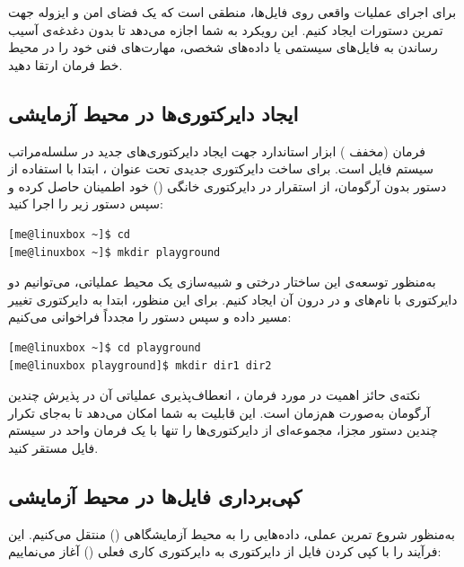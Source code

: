 برای اجرای عملیات واقعی روی فایل‌ها، منطقی است که یک فضای امن و ایزوله جهت تمرین دستورات ایجاد کنیم. این رویکرد به شما اجازه می‌دهد تا بدون دغدغه‌ی آسیب رساندن به فایل‌های سیستمی یا داده‌های شخصی، مهارت‌های فنی خود را در محیط خط فرمان ارتقا دهید.

\subsection{ایجاد دایرکتوری‌ها در محیط آزمایشی}

فرمان  (مخفف ) ابزار استاندارد جهت ایجاد دایرکتوری‌های جدید در سلسله‌مراتب سیستم‌ فایل است. برای ساخت دایرکتوری جدیدی تحت عنوان ، ابتدا با استفاده از دستور  بدون آرگومان، از استقرار در دایرکتوری خانگی () خود اطمینان حاصل کرده و سپس دستور زیر را اجرا کنید:

\begin{latin}
\begin{lstlisting}
[me@linuxbox ~]$ cd
[me@linuxbox ~]$ mkdir playground
\end{lstlisting}
\end{latin}

به‌منظور توسعه‌ی این ساختار درختی و شبیه‌سازی یک محیط عملیاتی، می‌توانیم دو دایرکتوری با نام‌های  و  در درون آن ایجاد کنیم. برای این منظور، ابتدا به دایرکتوری  تغییر مسیر داده و سپس دستور  را مجدداً فراخوانی می‌کنیم:

\begin{latin}
\begin{lstlisting}
[me@linuxbox ~]$ cd playground
[me@linuxbox playground]$ mkdir dir1 dir2
\end{lstlisting}
\end{latin}

نکته‌ی حائز اهمیت در مورد فرمان ، انعطاف‌پذیری عملیاتی آن در پذیرش چندین آرگومان به‌صورت هم‌زمان است. این قابلیت به شما امکان می‌دهد تا به‌جای تکرار چندین دستور مجزا، مجموعه‌ای از دایرکتوری‌ها را تنها با یک فرمان واحد در سیستم‌ فایل مستقر کنید.

\subsection{کپی‌برداری فایل‌ها در محیط آزمایشی}

به‌منظور شروع تمرین عملی، داده‌هایی را به محیط آزمایشگاهی () منتقل می‌کنیم. این فرآیند را با کپی کردن فایل  از دایرکتوری  به دایرکتوری کاری فعلی () آغاز می‌نماییم:


